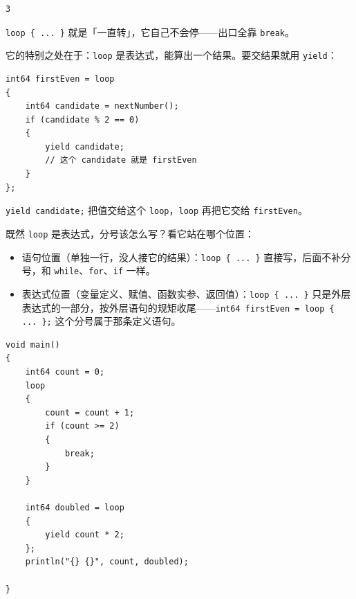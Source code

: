 \par
\medskip
\begin{lstlisting}[style=out]
3
\end{lstlisting}
\par
\medskip

\texttt{loop \{ .\allowbreak{}.\allowbreak{}.\allowbreak{} \}} 就是「一直转」，它自己不会停——出口全靠 \texttt{break}。

它的特别之处在于：\texttt{loop} 是表达式，能算出一个结果。要交结果就用 \texttt{yield}：

\par
\medskip
\begin{lstlisting}[style=chali]
int64 firstEven = loop
{
    int64 candidate = nextNumber();
    if (candidate % 2 == 0)
    {
        yield candidate;
        // 这个 candidate 就是 firstEven
    }
};
\end{lstlisting}
\par
\medskip

\texttt{yield candidate;} 把值交给这个 \texttt{loop}，\texttt{loop} 再把它交给 \texttt{first\allowbreak{}Even}。

既然 \texttt{loop} 是表达式，分号该怎么写？看它站在哪个位置：

\begin{itemize}

\item 语句位置（单独一行，没人接它的结果）：\texttt{loop \{ .\allowbreak{}.\allowbreak{}.\allowbreak{} \}} 直接写，后面不补分号，和 \texttt{while}、\texttt{for}、\texttt{if} 一样。

\item 表达式位置（变量定义、赋值、函数实参、返回值）：\texttt{loop \{ .\allowbreak{}.\allowbreak{}.\allowbreak{} \}} 只是外层表达式的一部分，按外层语句的规矩收尾——\texttt{int64 first\allowbreak{}Even =\allowbreak{} loop \{ .\allowbreak{}.\allowbreak{}.\allowbreak{} \};} 这个分号属于那条定义语句。

\end{itemize}

\par
\medskip
\begin{lstlisting}[style=chali]
void main()
{
    int64 count = 0;
    loop
    {
        count = count + 1;
        if (count >= 2)
        {
            break;
        }
    }

    int64 doubled = loop
    {
        yield count * 2;
    };
    println("{} {}", count, doubled);

}
\end{lstlisting}
\par
\medskip

